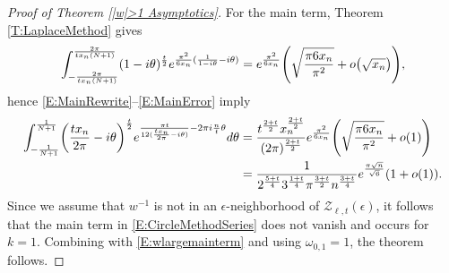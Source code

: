 \documentclass[11pt]{article}
\numberwithin{equation}{section}
\begin{document}
\begin{proof}[Proof of Theorem \ref{|w|>1 Asymptotics}]
For the main term, Theorem \ref{T:LaplaceMethod} gives
\begin{equation}\label{E:MainError}
\int_{-\frac{2\pi}{tx_n(N+1)}}^{\frac{2\pi}{tx_n(N+1)}} (1-{\rm i}\theta)^{\frac{t}{2}}{\rm e}^{\frac{\pi^2}{6x_n}( \frac{1}{1-{\rm i}\theta}- {\rm i}\theta)}={\rm e}^{\frac{\pi^2}{6x_n}}\Biggl(\sqrt{\frac{\pi6x_n}{\pi^2}}+o\big( \sqrt{x_n}\big)\Biggr),
\end{equation}
hence \eqref{E:MainRewrite}--\eqref{E:MainError} imply
\begin{align}
 \int_{-\frac{1}{N+1}}^{\frac{1}{N+1}} \biggl(\frac{tx_n}{2\pi}-{\rm i}\theta\biggr)^{\frac{t}{2}}{\rm e}^{\frac{\pi t}{12(\frac{tx_n}{2\pi}-{\rm i}\theta)}-2\pi {\rm i} \frac{n}{t} \theta} {\rm d}\theta
 &{}=\frac{t^{\frac{2+t}{2}}x_n^{\frac{2+t}{2}}}{(2\pi)^{\frac{2+t}{2}}}{\rm e}^{\frac{\pi^2}{6x_n}}\Biggl(\sqrt{\frac{\pi6x_n}{\pi^2}}+o( 1) \Biggr) \nonumber \\
 &{}=\frac{1}{2^{\frac{5+t}{4}}3^{\frac{1+t}{4}}\pi^{\frac{3+t}{2}}n^{\frac{3+t}{4}}}{\rm e}^{\frac{\pi\sqrt{n}}{\sqrt{6}}}(1+o(1)). \label{E:wlargemainterm}
\end{align}
Since we assume that $w^{-1}$ is not in an $\epsilon$-neighborhood of $\mathcal{Z}_{\ell,t}(\epsilon)$, it follows that the main term in \eqref{E:CircleMethodSeries} does not vanish and occurs for $k=1$. Combining with \eqref{E:wlargemainterm} and using $\omega_{0,1}=1$, the theorem follows.
\end{proof}
\end{document}
